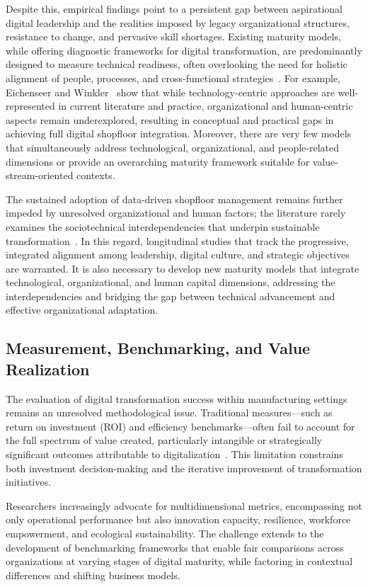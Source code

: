 \documentclass[sigconf]{acmart}
\begin{document}
Despite this, empirical findings point to a persistent gap between aspirational digital leadership and the realities imposed by legacy organizational structures, resistance to change, and pervasive skill shortages. Existing maturity models, while offering diagnostic frameworks for digital transformation, are predominantly designed to measure technical readiness, often overlooking the need for holistic alignment of people, processes, and cross-functional strategies~\cite{ref63,ref68}. For example, Eichenseer and Winkler~\cite{ref63} show that while technology-centric approaches are well-represented in current literature and practice, organizational and human-centric aspects remain underexplored, resulting in conceptual and practical gaps in achieving full digital shopfloor integration. Moreover, there are very few models that simultaneously address technological, organizational, and people-related dimensions or provide an overarching maturity framework suitable for value-stream-oriented contexts.

The sustained adoption of data-driven shopfloor management remains further impeded by unresolved organizational and human factors; the literature rarely examines the sociotechnical interdependencies that underpin sustainable transformation~\cite{ref63}. In this regard, longitudinal studies that track the progressive, integrated alignment among leadership, digital culture, and strategic objectives are warranted. It is also necessary to develop new maturity models that integrate technological, organizational, and human capital dimensions, addressing the interdependencies and bridging the gap between technical advancement and effective organizational adaptation.

\subsection{Measurement, Benchmarking, and Value Realization}

The evaluation of digital transformation success within manufacturing settings remains an unresolved methodological issue. Traditional measures---such as return on investment (ROI) and efficiency benchmarks---often fail to account for the full spectrum of value created, particularly intangible or strategically significant outcomes attributable to digitalization~\cite{ref94}. This limitation constrains both investment decision-making and the iterative improvement of transformation initiatives.

Researchers increasingly advocate for multidimensional metrics, encompassing not only operational performance but also innovation capacity, resilience, workforce empowerment, and ecological sustainability. The challenge extends to the development of benchmarking frameworks that enable fair comparisons across organizations at varying stages of digital maturity, while factoring in contextual differences and shifting business models.
\end{document}
